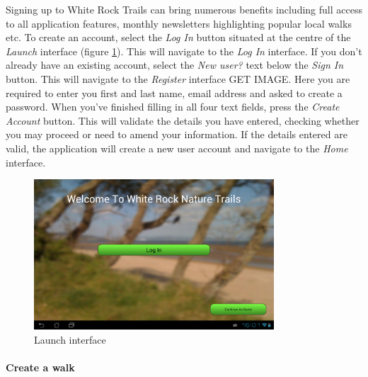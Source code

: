 \documentclass[11pt,a4paper]{report}
\begin{document}
Signing up to White Rock Trails can bring numerous benefits including full access to all application features, monthly newsletters highlighting popular local walks etc. To create an account, select the \emph{Log In} button situated at the centre of the \emph{Launch} interface (figure \ref{fig:launch_viewUM}). This will navigate to the \emph{Log In} interface. If you don't already have an existing account, select the \emph{New user?} text below the \emph{Sign In} button. This will navigate to the \emph{Register} interface GET IMAGE. Here you are required to enter you first and last name, email address and asked to create a password. When you've finished filling in all four text fields, press the \emph{Create Account} button. This will validate the details you have entered, checking whether you may proceed or need to amend your information. If the details entered are valid, the application will create a new user account and navigate to the \emph{Home} interface.

\begin{figure}[H]
    \centering
    \includegraphics[width=0.8\textwidth]{chris/launch_view}
    \caption{Launch interface}
    \label{fig:launch_viewUM}
\end{figure}

\paragraph*{Create a walk}\mbox{}\\
\end{document}
